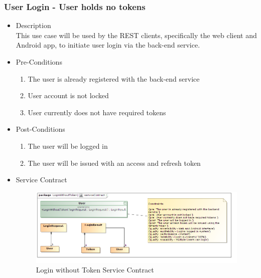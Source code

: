 \documentclass[a4paper,10pt]{article}
\begin{document}
\subsubsection{User Login - User holds no tokens}
	\begin{itemize}
		\item Description\\
		This use case will be used by the REST clients, specifically the web client and Android app, to initiate user login via the back-end service. 
		\item Pre-Conditions
			\begin{enumerate}
				\item The user is already registered with the back-end service
				\item User account is not locked
				\item User currently does not have required tokens
			\end{enumerate}
		\item Post-Conditions
			\begin{enumerate}
				\item The user will be logged in
				\item The user will be issued with an access and refresh token	
			\end{enumerate}
		\item Service Contract
			\begin{figure}[H]
				\includegraphics[scale=0.5]{loginWithoutToken}
				\caption{Login without Token Service Contract}
			\end{figure}
	\end{itemize}
	
\end{document}
